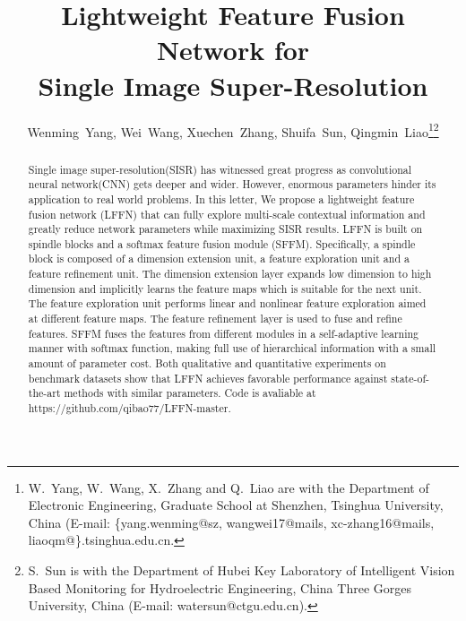 \documentclass[journal]{IEEEtran}
\begin{document}
\title{Lightweight Feature Fusion Network for\\Single Image Super-Resolution}


\author{Wenming~Yang, Wei~Wang, Xuechen~Zhang, Shuifa~Sun, Qingmin~Liao\thanks{W.~Yang, W.~Wang, X.~Zhang and Q.~Liao are with the Department of Electronic Engineering, Graduate School at Shenzhen, Tsinghua University, China (E-mail: \{yang.wenming@sz, wangwei17@mails, xc-zhang16@mails, liaoqm@\}.tsinghua.edu.cn.}\thanks {S.~Sun is with the Department of Hubei Key Laboratory of Intelligent Vision Based Monitoring for Hydroelectric Engineering, China Three Gorges University, China (E-mail: watersun@ctgu.edu.cn).}
}



















\maketitle

\begin{abstract}
Single image super-resolution(SISR) has witnessed great progress as convolutional neural network(CNN) gets deeper and wider. However, enormous parameters hinder its application to real world problems. In this letter, We propose a lightweight feature fusion network (LFFN) that can fully explore multi-scale contextual information and greatly reduce network parameters while maximizing SISR results. LFFN is built on spindle blocks and a softmax feature fusion module (SFFM). Specifically, a spindle block is composed of a dimension extension unit, a feature exploration unit and a feature refinement unit. The dimension extension layer expands low dimension to high dimension and implicitly learns the feature maps which is suitable for the next unit. The feature exploration unit performs linear and nonlinear feature exploration aimed at different feature maps. The feature refinement layer is used to fuse and refine features. SFFM fuses the features from different modules in a self-adaptive learning manner with softmax function, making full use of hierarchical information with a small amount of parameter cost. Both qualitative and quantitative experiments on benchmark datasets show that LFFN achieves favorable performance against state-of-the-art methods with similar parameters. Code is avaliable at https://github.com/qibao77/LFFN-master.
\end{abstract}
\end{document}
